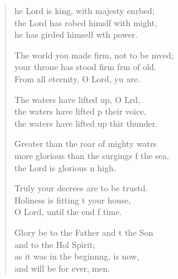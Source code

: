 \settowidth{\versewidth}{more glorious than the surgings of the sea, *}
\begin{verse}%
  \begin{patverse}
he Lord is king, with majesty enrbed;\Flex\\
    the Lord has robed himslf with might,\Med\\
    he has girded himself w\pointup{\i}th power.

The world you made firm, not to be mved;\Flex\\
    your throne has stood firm frm of old.\Med\\
    From all eternity, O Lord, yu are.

The waters have lifted up, O Lrd,\Flex\\
    the waters have lifted p their voice,\Med\\
    the waters have lifted up thir thunder.

Greater than the roar of mighty watrs\Flex\\
    more glorious than the surgings f the sea,\Med\\
    the Lord is glorious n high.

Truly your decrees are to be trustd.\Flex\\
    Holiness is fitting t your house,\Med\\
    O Lord, until the end f time.

Glory be to the Father and t the Son\Med\\
    and to the Hol Spirit;\\
as it was in the beginn\pointup{\i}ng, is now,\Med\\
    and will be for ever, men.
  \end{patverse}
\end{verse}
